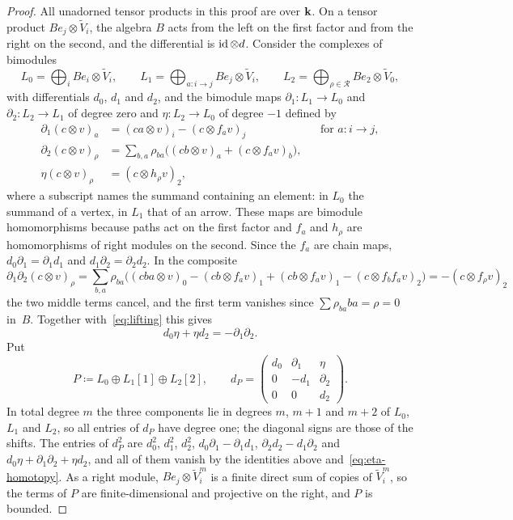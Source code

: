 \begin{proof}
  All unadorned tensor products in this proof are over $\mathbf{k}$. On a tensor
  product ${Be_j\otimes\widetilde{V}_i}$, the algebra $B$ acts from the left on
  the first factor and from the right on the second, and the differential is
  ${\id\otimes d}$. Consider the complexes of bimodules
  \[
    L_0=\bigoplus_{i}Be_i\otimes\widetilde{V}_i,\qquad
    L_1=\bigoplus_{a\colon i\to j}Be_j\otimes\widetilde{V}_i,\qquad
    L_2=\bigoplus_{\rho\in\mathcal{R}}Be_2\otimes\widetilde{V}_0,
  \]
  with differentials $d_0$, $d_1$ and $d_2$, and the bimodule maps
  ${\partial_1\colon L_1\to L_0}$ and ${\partial_2\colon L_2}\to{ L_1}$ of degree
  zero and ${\eta\colon L_2\to L_0}$ of degree ${-1}$ defined by
  \begin{equation}
    \label{eq:rectification-maps}
    \begin{aligned}
      \partial_1(c\otimes v)_a&=(ca\otimes v)_i-(c\otimes f_av)_j
        &&\text{for }a\colon i\to j,\\
      \partial_2(c\otimes v)_\rho&=\sum_{b,a}\rho_{ba}\bigl((cb\otimes v)_a
        +(c\otimes f_av)_b\bigr),\\
      \eta(c\otimes v)_\rho&=(c\otimes h_\rho v)_2,
    \end{aligned}
  \end{equation}
  where a subscript names the summand containing an element: in $L_0$ the
  summand of a vertex, in $L_1$ that of an arrow. These maps are
  bimodule homomorphisms because paths act on the first factor and $f_a$ and
  $h_\rho$ are homomorphisms of right modules on the second. Since the $f_a$
  are chain maps, ${d_0\partial_1=\partial_1d_1}$ and
  ${d_1\partial_2=\partial_2d_2}$. In the composite
  \[
    \partial_1\partial_2(c\otimes v)_\rho=\sum_{b,a}\rho_{ba}\bigl(
    (cba\otimes v)_0-(cb\otimes f_av)_1+(cb\otimes f_av)_1
    -(c\otimes f_bf_av)_2\bigr)=-(c\otimes f_\rho v)_2
  \]
  the two middle terms cancel, and the first term vanishes since
  ${\sum\rho_{ba}ba=\rho=0}$ in~$B$. Together with~\eqref{eq:lifting} this gives
  \begin{equation}
    \label{eq:eta-homotopy}
    d_0\eta+\eta d_2=-\partial_1\partial_2.
  \end{equation}
  Put
  \[
    P\coloneqq L_0\oplus L_1[1]\oplus L_2[2],\qquad
    d_P=\begin{pmatrix}d_0&\partial_1&\eta\\0&-d_1&\partial_2\\0&0&d_2
    \end{pmatrix}.
  \]
  In total degree $m$ the three components lie in degrees $m$, ${m+1}$ and
  ${m+2}$ of $L_0$, $L_1$ and $L_2$, so all entries of $d_P$ have degree one; the
  diagonal signs are those of the shifts. The entries of $d_P^2$ are $d_0^2$,
  $d_1^2$, $d_2^2$, ${d_0\partial_1-\partial_1d_1}$,
  ${\partial_2d_2-d_1\partial_2}$ and ${d_0\eta+\partial_1\partial_2+\eta d_2}$,
  and all of them vanish by the identities above and~\eqref{eq:eta-homotopy}.
  As a right module, ${Be_j\otimes\widetilde{V}_i^m}$ is a finite direct sum of
  copies of $\widetilde{V}_i^m$, so the terms of $P$ are finite-dimensional and
  projective on the right, and $P$ is bounded.


\end{proof}
